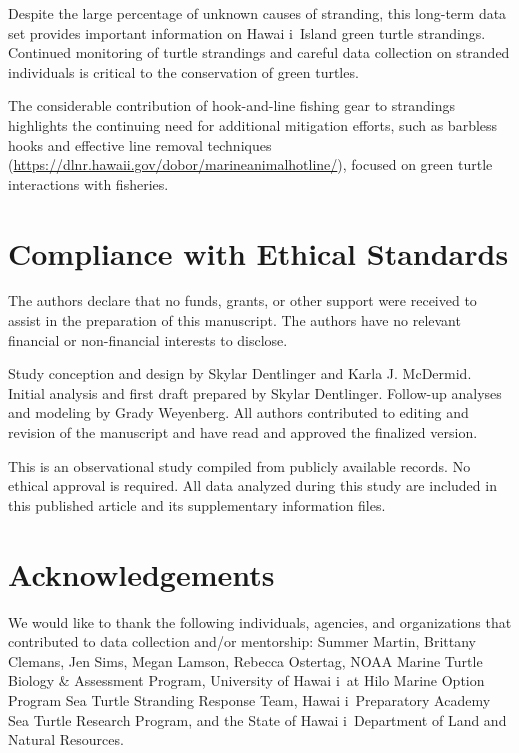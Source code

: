 \documentclass[sn-basic,NameDate]{sn-jnl}\usepackage[]{graphicx}\usepackage[]{xcolor}
\DeclareRobustCommand{\okina}{%
  \raisebox{\dimexpr\fontcharht\font`A-\height}{%
    \scalebox{0.8}{`}%
  }%
}
\newcommand{\Hawaii}{Hawai\okina i}
\begin{document}
Despite the large percentage of unknown causes of stranding, this long-term data set provides important information on \Hawaii\ Island green turtle strandings.
Continued monitoring of turtle strandings and careful data collection on stranded individuals is critical to the conservation of green turtles.

The considerable contribution of hook-and-line fishing gear to strandings highlights the continuing need for additional mitigation efforts, such as barbless hooks and effective line removal techniques (\url{https://dlnr.hawaii.gov/dobor/marineanimalhotline/}), focused on green turtle interactions with fisheries.

\section{Compliance with Ethical Standards}

The authors declare that no funds, grants, or other support were received to assist in the preparation of this manuscript.
The authors have no relevant financial or non-financial interests to disclose.

Study conception and design by Skylar Dentlinger and Karla J. McDermid. 
Initial analysis and first draft prepared by Skylar Dentlinger. 
Follow-up analyses and modeling by Grady Weyenberg. 
All authors contributed to editing and revision of the manuscript and have read and approved the finalized version.

This is an observational study compiled from publicly available records. 
No ethical approval is required.
All data analyzed during this study are included in this published article and its supplementary information files.


\section{Acknowledgements}
We would like to thank the following individuals, agencies, and organizations that contributed to data collection and/or mentorship:
Summer Martin, 
Brittany Clemans, 
Jen Sims, 
Megan Lamson, 
Rebecca Ostertag, 
NOAA Marine Turtle Biology \& Assessment Program,
University of  \Hawaii\ at Hilo Marine Option Program Sea Turtle Stranding Response Team,
\Hawaii\ Preparatory Academy Sea Turtle Research Program,
and the State of \Hawaii\ Department of Land and Natural Resources.


\end{document}
